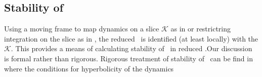 


\subsection{Stability of \reqva}
\label{s:StabReq}

Using a moving frame to map dynamics on a slice $\mathcal{K}$
as in  or restrictring
integration on the slice as in , 
the reduced \statesp\ is
identified (at least locally) with the {\csection}
$\mathcal{K}$. This provides a means of calculating stability
of \reqva\ in reduced \statesp.Our discussion is formal rather
than rigorous. Rigorous treatment of stability of \reqva\ can
be find in  where the conditions for hyperbolicity
of the dynamics 


